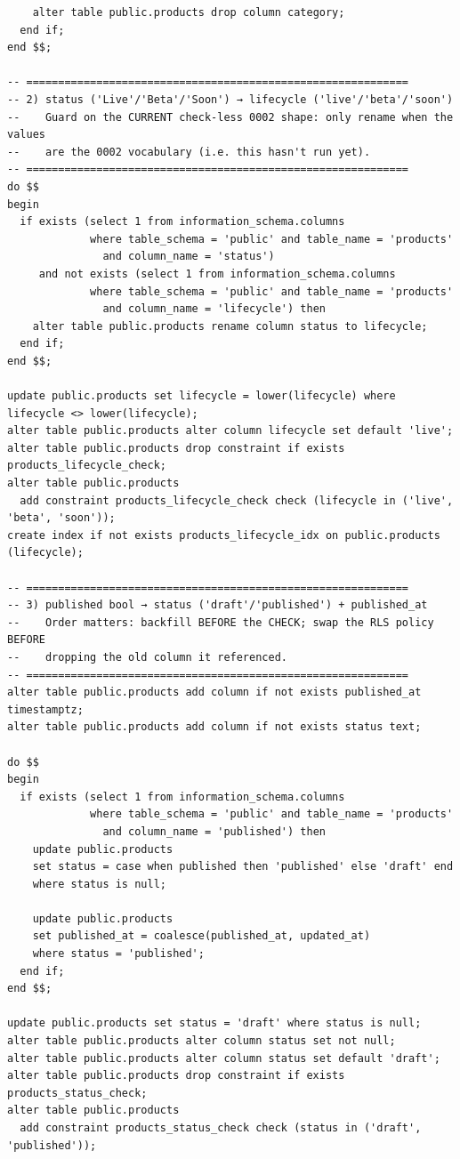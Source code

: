 \documentclass[11pt,a4paper]{article}
\begin{document}
\begin{lstlisting}
    alter table public.products drop column category;
  end if;
end $$;

-- ============================================================
-- 2) status ('Live'/'Beta'/'Soon') → lifecycle ('live'/'beta'/'soon')
--    Guard on the CURRENT check-less 0002 shape: only rename when the values
--    are the 0002 vocabulary (i.e. this hasn't run yet).
-- ============================================================
do $$
begin
  if exists (select 1 from information_schema.columns
             where table_schema = 'public' and table_name = 'products'
               and column_name = 'status')
     and not exists (select 1 from information_schema.columns
             where table_schema = 'public' and table_name = 'products'
               and column_name = 'lifecycle') then
    alter table public.products rename column status to lifecycle;
  end if;
end $$;

update public.products set lifecycle = lower(lifecycle) where lifecycle <> lower(lifecycle);
alter table public.products alter column lifecycle set default 'live';
alter table public.products drop constraint if exists products_lifecycle_check;
alter table public.products
  add constraint products_lifecycle_check check (lifecycle in ('live', 'beta', 'soon'));
create index if not exists products_lifecycle_idx on public.products (lifecycle);

-- ============================================================
-- 3) published bool → status ('draft'/'published') + published_at
--    Order matters: backfill BEFORE the CHECK; swap the RLS policy BEFORE
--    dropping the old column it referenced.
-- ============================================================
alter table public.products add column if not exists published_at timestamptz;
alter table public.products add column if not exists status text;

do $$
begin
  if exists (select 1 from information_schema.columns
             where table_schema = 'public' and table_name = 'products'
               and column_name = 'published') then
    update public.products
    set status = case when published then 'published' else 'draft' end
    where status is null;

    update public.products
    set published_at = coalesce(published_at, updated_at)
    where status = 'published';
  end if;
end $$;

update public.products set status = 'draft' where status is null;
alter table public.products alter column status set not null;
alter table public.products alter column status set default 'draft';
alter table public.products drop constraint if exists products_status_check;
alter table public.products
  add constraint products_status_check check (status in ('draft', 'published'));


\end{lstlisting}
\end{document}
